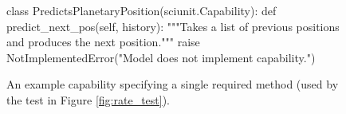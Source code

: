 \documentclass[9pt]{sig-alternate}
\begin{document}

\begin{figure}
\begin{python}
class PredictsPlanetaryPosition(sciunit.Capability):
  def predict_next_pos(self, history): 
    """Takes a list of previous positions and produces the next position."""
    raise NotImplementedError("Model does not implement capability.")
\end{python}
\caption{An example capability specifying a single required method (used by the test in Figure \ref{fig:rate_test}).}
\label{fig:capability}
\vspace{-10px}
\end{figure}

\end{document}
